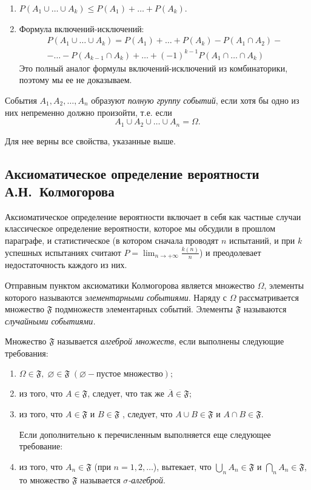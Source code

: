 \begin{enumerate}
\item
$P(A_1\cup\dots\cup A_k) \le P(A_1)+\dots+P(A_k)$.

\item Формула вклю\-чений-исключений:
\begin{multline*}
P(A_1\cup\dots\cup A_k)= P(A_1)+\dots+P(A_k)-P(A_1\cap A_2)-\\-\dots -P(A_{k-1}\cap A_{k})+ \dots + (-1)^{k-1}P(A_1\cap\dots\cap A_k)
\end{multline*}
Это полный аналог формулы вклю\-чений-исключений из комбинаторики, поэтому мы ее не доказываем.
\end{enumerate}

\begin{defn}
События $A_1, A_2,  \dots, A_n$ образуют \textit{полную группу событий}, если хотя бы одно из них непременно должно произойти, т.е. если
$$
A_1\cup A_2\cup\dots\cup A_n=\Omega.
$$
\end{defn}
Для нее верны все свойства, указанные выше.

\subsection{Аксиоматическое определение вероятности А.Н.~Колмогорова}

Аксиоматическое определение вероятности включает в себя как частные случаи классическое определение вероятности, которое мы обсудили в прошлом параграфе, и статистическое (в котором сначала проводят $n$ испытаний, и при $k$ успешных испытаниях считают $P=\lim_{n \to +\infty}\limits\frac{k(n)}{n}$) и преодолевает недостаточность каждого из них.

Отправным пунктом аксиоматики Колмогорова является множество $\Omega$, элементы которого называются \textit{элементарными событиями}. Наряду с $\Omega$ рассматривается множество $\mathfrak{F}$ подмножеств элементарных событий. Элементы $\mathfrak{F}$ называются \textit{случайными событиями.}
\begin{defn} Множество $\mathfrak{F}$ называется \textit{алгеброй множеств}, если выполнены следующие требования:
\begin{enumerate}
\item
$\Omega \in \mathfrak{F},\; \varnothing \in \mathfrak{F} \;(\varnothing - \text{пустое множество});$
\item
из того, что $A \in \mathfrak{F}$, следует, что так же $\overline{A} \in \mathfrak{F}$;
\item
из того, что  $A \in \mathfrak{F}$ и $B \in \mathfrak{F}$ , следует, что $A \cup B \in \mathfrak{F}$ и $A \cap B \in \mathfrak{F}$.

Если дополнительно к перечисленным выполняется еще следующее требование:
\item
из того, что $A_n \in \mathfrak{F}$ (при $n = 1,2, \ldots$), вытекает, что $\bigcup\limits_{n} A_n \in \mathfrak{F}$ и $\bigcap\limits_{n} A_n \in \mathfrak{F}$, то множество $\mathfrak{F}$ называется \textit{$\sigma$-алгеброй}. 
\end{enumerate}
\end{defn}

